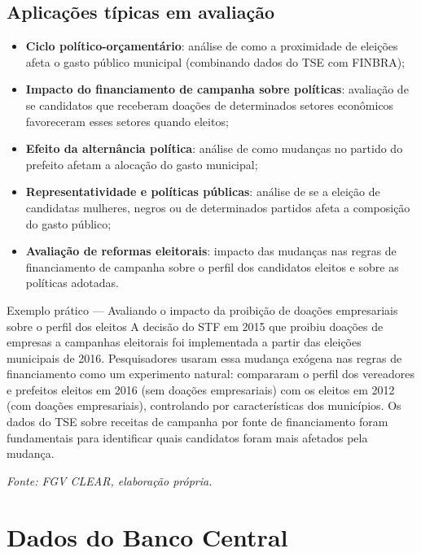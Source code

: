 \subsection{Aplicações típicas em avaliação}

\begin{itemize}
  \item \textbf{Ciclo político-orçamentário}: análise de como a proximidade de eleições afeta o gasto público municipal (combinando dados do TSE com FINBRA);
  \item \textbf{Impacto do financiamento de campanha sobre políticas}: avaliação de se candidatos que receberam doações de determinados setores econômicos favoreceram esses setores quando eleitos;
  \item \textbf{Efeito da alternância política}: análise de como mudanças no partido do prefeito afetam a alocação do gasto municipal;
  \item \textbf{Representatividade e políticas públicas}: análise de se a eleição de candidatas mulheres, negros ou de determinados partidos afeta a composição do gasto público;
  \item \textbf{Avaliação de reformas eleitorais}: impacto das mudanças nas regras de financiamento de campanha sobre o perfil dos candidatos eleitos e sobre as políticas adotadas.
\end{itemize}

\begin{boxexemplo}{Exemplo prático --- Avaliando o impacto da proibição de doações empresariais sobre o perfil dos eleitos}
A decisão do STF em 2015 que proibiu doações de empresas a campanhas eleitorais foi implementada a partir das eleições municipais de 2016. Pesquisadores usaram essa mudança exógena nas regras de financiamento como um experimento natural: compararam o perfil dos vereadores e prefeitos eleitos em 2016 (sem doações empresariais) com os eleitos em 2012 (com doações empresariais), controlando por características dos municípios. Os dados do TSE sobre receitas de campanha por fonte de financiamento foram fundamentais para identificar quais candidatos foram mais afetados pela mudança.

\textit{Fonte: FGV CLEAR, elaboração própria.}
\end{boxexemplo}

\section{Dados do Banco Central}

